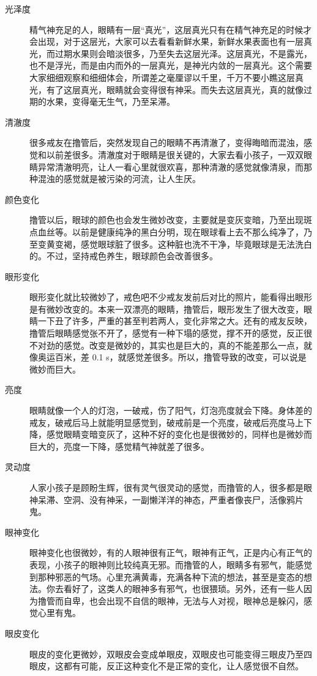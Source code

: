 \begin{description}
    \item[光泽度] 精气神充足的人，眼睛有一层“真光”，这层真光只有在精气神充足的时候才会出现，对于这层光，大家可以去看看新鲜水果，新鲜水果表面也有一层真光，而过期水果则会暗淡很多，乃至失去这层光泽。这层真光，不是露光，也不是浮光，而是由内而外的一层真光，是神光内敛的一层真光。这个需要大家细细观察和细细体会，所谓差之毫厘谬以千里，千万不要小瞧这层真光，有了这层真光，眼睛就会变得很有神采。而失去这层真光，真的就像过期的水果，变得毫无生气，乃至呆滞。
    \item[清澈度] 很多戒友在撸管后，突然发现自己的眼睛不再清澈了，变得晦暗而混浊，感觉和以前差很多。清澈度对于眼睛是很关键的，大家去看小孩子，一双双眼睛异常清澈明亮，让人一看心里就很欢喜，那种清澈的感觉就像清泉，而那种混浊的感觉就是被污染的河流，让人生厌。
    \item[颜色变化] 撸管以后，眼球的颜色也会发生微妙改变，主要就是变灰变暗，乃至出现斑点血丝等。以前是健康纯净的黑白分明，现在眼球看上去不那么纯净了，乃至变黄变褐，感觉眼球脏了很多。这种脏也洗不干净，毕竟眼球是无法洗白的。不过，坚持戒色养生，眼球颜色会改善很多。
    \item[眼形变化] 眼形变化就比较微妙了，戒色吧不少戒友发前后对比的照片，能看得出眼形是有微妙改变的。本来一双漂亮的眼睛，撸管后，眼形发生了很大改变，眼睛一下丑了许多，严重的甚至判若两人，变化非常之大。还有的戒友反映，撸管后眼睛感觉张不开了，感觉有一种下塌的感觉，撑不开的感觉，反正很不对劲的感觉。改变是微妙的，其实也是巨大的，真的不能差那么一点，就像奥运百米，差 0.1 \unit{\s}，就感觉差很多。所以，撸管导致的改变，可以说是微妙而巨大。
    \item[亮度] 眼睛就像一个人的灯泡，一破戒，伤了阳气，灯泡亮度就会下降。身体差的戒友，破戒后马上就能明显感觉到，破戒前是一个亮度，破戒后亮度马上下降，感觉眼睛变暗变灰了，这种不好的变化也是很微妙的，同样也是微妙而巨大的，亮度一下降，感觉精气神就差了很多。
    \item[灵动度] 人家小孩子是顾盼生辉，很有灵气很灵动的感觉，而撸管的人，很多都是眼神呆滞、空洞、没有神采，一副懒洋洋的神态，严重者像丧尸，活像鸦片鬼。
    \item[眼神变化] 眼神变化也很微妙，有的人眼神很有正气，眼神有正气，正是内心有正气的表现，小孩子的眼神则比较纯真无邪。而撸管的人，眼睛多有邪气，能感觉到那种邪恶的气场。心里充满黄毒，充满各种下流的想法，甚至是变态的想法。你去看好了，这类人的眼神多有邪气，也很猥琐。另外，还有一些人因为撸管而自卑，也会出现不自信的眼神，无法与人对视，眼神总是躲闪，感觉心里有鬼。
    \item[眼皮变化] 眼皮的变化更微妙，双眼皮会变成单眼皮，双眼皮也可能变得三眼皮乃至四眼皮，这都有可能，反正这种变化不是正常的变化，让人感觉很不自然。

\end{description}

